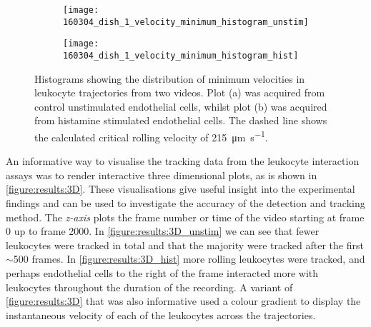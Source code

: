 \begin{figure}[htbp]\centering
	\begin{subfigure}[b]{0.49\linewidth}
		\centering
		\texttt{[image: 160304\_dish\_1\_velocity\_minimum\_histogram\_unstim]}
		\caption{}
		\label{figure:results:min_velocity_unstim}
		\vspace{1ex}
	\end{subfigure}
	\begin{subfigure}[b]{0.49\linewidth}
		\centering
		\texttt{[image: 160304\_dish\_1\_velocity\_minimum\_histogram\_hist]}
		\caption{}
		\label{figure:results:min_velocity_hist}
		\vspace{1ex}
	\end{subfigure}
\caption[Histogram of minimum velocities of leukocyte trajectories]{Histograms showing the distribution of minimum velocities in leukocyte trajectories from two videos. Plot (a) was acquired from control unstimulated endothelial cells, whilst plot (b) was acquired from histamine stimulated endothelial cells. The dashed line shows the calculated critical rolling velocity of \SI{215}{\micro\meter\per\second}.}
\label{figure:results:min_velocity_histograms}
\end{figure}

An informative way to visualise the tracking data from the leukocyte interaction assays was to render interactive three dimensional plots, as is shown in \autoref{figure:results:3D}. These visualisations give useful insight into the experimental findings and can be used to investigate the accuracy of the detection and tracking method. The \emph{z-axis} plots the frame number or time of the video starting at frame 0 up to frame 2000. In \autoref{figure:results:3D_unstim} we can see that fewer leukocytes were tracked in total and that the majority were tracked after the first $\sim$500 frames. In \autoref{figure:results:3D_hist} more rolling leukocytes were tracked, and perhaps endothelial cells to the right of the frame interacted more with leukocytes throughout the duration of the recording. A variant of \autoref{figure:results:3D} that was also informative used a colour gradient to display the instantaneous velocity of each of the leukocytes across the trajectories.


